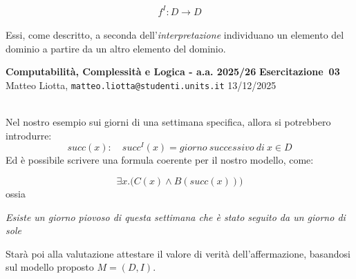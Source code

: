 \documentclass[a4paper,10pt]{article}
\makeatletter
\newcommand{\DocType}{Esercitazione} %
\newcommand{\FullTitle}{\DocType\ \EsercitazioneNum}
\newcommand{\Header}{
\noindent
  \small \textbf{Computabilità, Complessità e Logica - a.a. 2025/26} \hfill \textbf{\FullTitle} \\[0.2cm]
  \scriptsize Matteo Liotta, \texttt{matteo.liotta@studenti.units.it} \hfill \Data \\[0.2cm]
  \noindent\makebox[\linewidth]{\rule{\linewidth}{0.4pt}} \\[0.3cm]}
\newcommand{\NewPageHeader}{
  \vfill
  \noindent\makebox[\linewidth]{\rule{\linewidth}{0.4pt}}
  \newpage
  {\Header}
}
\newcommand{\EsercitazioneNum}{03}
\newcommand{\Data}{13/12/2025}
\makeatother
\begin{document}
$$f^I:D\rightarrow D$$\\
Essi, come descritto, a seconda dell'\textit{interpretazione} individuano un elemento del dominio a partire da un altro elemento del dominio. 
\NewPageHeader

Nel nostro esempio sui giorni di una settimana specifica, allora si potrebbero introdurre:
$$succ(x):\quad succ^I(x)=giorno\ successivo\ di\ x\in D$$
Ed è possibile scrivere una formula coerente per il nostro modello, come:

$$\exists x.\bigg(C(x)\land B(succ(x))\bigg)$$
ossia
\begin{center}
\textit{Esiste un giorno piovoso di questa settimana che è stato seguito da un giorno di sole}
\end{center}
Starà poi alla valutazione attestare il valore di verità dell'affermazione, basandosi sul modello proposto $M=(D,I)$.


\vfill
\noindent\makebox[\linewidth]{\rule{\linewidth}{0.1pt}}
\end{document}
